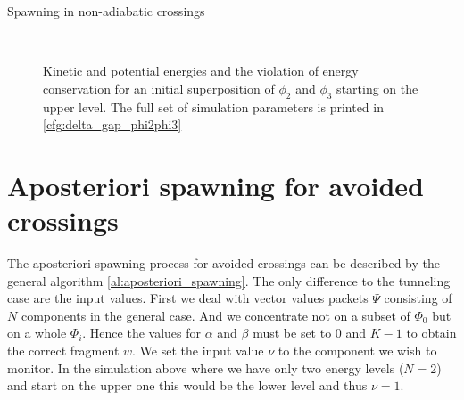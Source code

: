\begin{chapter}{Spawning in non-adiabatic crossings}
\begin{figure}[h!]
  \centering
   \\
  \caption[Energies for a superposition of $\phi_2$ and $\phi_3$ in an avoided crossing]{
  Kinetic and potential energies and the violation of energy conservation for an
  initial superposition of $\phi_2$ and $\phi_3$ starting on the upper level. The
  full set of simulation parameters is printed in \ref{cfg:delta_gap_phi2phi3}
  \label{fig:basic_delta_gap_phi2phi3_energies}
  }
\end{figure}


\FloatBarrier
\section{Aposteriori spawning for avoided crossings}

The aposteriori spawning process for avoided crossings can be described by the
general algorithm \ref{al:aposteriori_spawning}. The only difference to the tunneling
case are the input values. First we deal with vector values packets $\Psi$ consisting
of $N$ components in the general case. And we concentrate not on a subset of $\Phi_0$
but on a whole $\Phi_i$. Hence the values for $\alpha$ and $\beta$ must be set
to $0$ and $K-1$ to obtain the correct fragment $w$. We set the input value $\nu$
to the component we wish to monitor. In the simulation above where we have only two
energy levels ($N=2$) and start on the upper one this would be the lower level
and thus $\nu = 1$.


\end{chapter}

